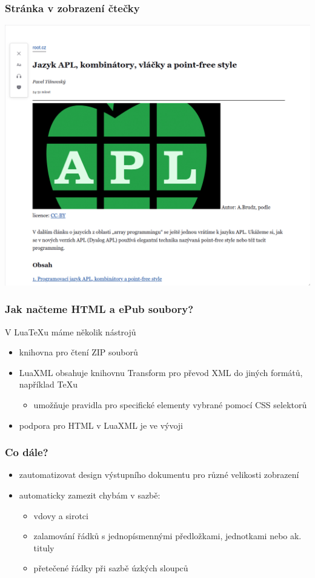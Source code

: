 \begin{frame}
  \frametitle{Stránka v zobrazení čtečky}
  \begin{center}
    \includegraphics[height=.9\textheight]{img/root-čtečka.png}
  \end{center}
\end{frame}

\begin{frame}
  \frametitle{Jak načteme HTML a ePub soubory?}
  V Lua\TeX u máme několik nástrojů
  \begin{itemize}
    \item knihovna pro čtení ZIP souborů
    \item LuaXML obsahuje knihovnu Transform pro převod XML do jiných formátů, například \TeX u
      \begin{itemize}
        \item umožňuje pravidla pro specifické elementy vybrané pomocí CSS selektorů
      \end{itemize}
    \item podpora pro HTML v LuaXML je ve vývoji
  \end{itemize}
\end{frame}

\begin{frame}
  \frametitle{Co dále?}
  \begin{itemize}
  \item  zautomatizovat design výstupního dokumentu pro různé velikosti zobrazení
  \item  automaticky zamezit chybám v sazbě:
    \begin{itemize}
      \item vdovy a sirotci
      \item zalamování řádků s jednopísmennými předložkami, jednotkami nebo ak. tituly
      \item přetečené řádky při sazbě úzkých sloupců
    \end{itemize}
  \end{itemize}
\end{frame}

